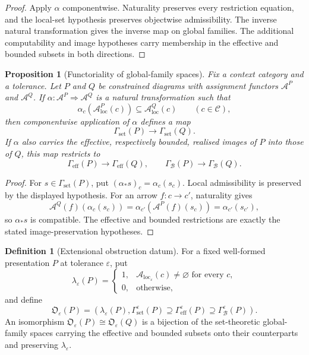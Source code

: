 \documentclass[11pt]{article}
\theoremstyle{plain}
\newtheorem{proposition}[theorem]{Proposition}
\theoremstyle{definition}
\newtheorem{definition}[theorem]{Definition}
\theoremstyle{remark}
\newcommand{\LocalAdm}{\mathcal{A}_{\mathrm{loc}}}
\newcommand{\eps}{\varepsilon}
\begin{document}
\begin{proof}
Apply $\alpha$ componentwise. Naturality preserves every restriction equation,
and the local-set hypothesis preserves objectwise admissibility. The inverse
natural transformation gives the inverse map on global families. The additional
computability and image hypotheses carry membership in the effective and bounded
subsets in both directions.
\end{proof}

\begin{proposition}[Functoriality of global-family spaces]
\label{prop:global-family-functoriality}
Fix a context category and a tolerance. Let $P$ and $Q$ be constrained diagrams
with assignment functors $\mathcal A^P$ and $\mathcal A^Q$. If
$\alpha:\mathcal A^P\Rightarrow\mathcal A^Q$ is a natural transformation such
that
\[
\alpha_c(\LocalAdm^P(c))\subseteq\LocalAdm^Q(c)
\qquad(c\in\mathcal C),
\]
then componentwise application of $\alpha$ defines a map
\[
\Gamma_{\mathrm{set}}(P)\longrightarrow\Gamma_{\mathrm{set}}(Q).
\]
If $\alpha$ also carries the effective, respectively bounded, realised images
of $P$ into those of $Q$, this map restricts to
\[
\Gamma_{\mathrm{eff}}(P)\to\Gamma_{\mathrm{eff}}(Q),
\qquad
\Gamma_{\mathcal B}(P)\to\Gamma_{\mathcal B}(Q).
\]
\end{proposition}

\begin{proof}
For $s\in\Gamma_{\mathrm{set}}(P)$, put
$(\alpha_*s)_c=\alpha_c(s_c)$. Local admissibility is preserved by the displayed
hypothesis. For an arrow $f:c\to c'$, naturality gives
\[
\mathcal A^Q(f)(\alpha_c(s_c))
=\alpha_{c'}(\mathcal A^P(f)(s_c))
=\alpha_{c'}(s_{c'}),
\]
so $\alpha_*s$ is compatible. The effective and bounded restrictions are exactly
the stated image-preservation hypotheses.
\end{proof}

\begin{definition}[Extensional obstruction datum]
\label{def:obstruction-datum}
For a fixed well-formed presentation $P$ at tolerance $\eps$, put
\[
\lambda_\eps(P)=
\begin{cases}
1,&\LocalAdm_\eps(c)\ne\varnothing\text{ for every }c,\\
0,&\text{otherwise},
\end{cases}
\]
and define
\[
\mathfrak O_\eps(P)=
\left(
\lambda_\eps(P),
\Gamma_{\mathrm{set}}^\eps(P)
\supseteq\Gamma_{\mathrm{eff}}^\eps(P)
\supseteq\Gamma_{\mathcal B}^\eps(P)
\right).
\]
An isomorphism $\mathfrak O_\eps(P)\cong\mathfrak O_\eps(Q)$ is a bijection of
the set-theoretic global-family spaces carrying the effective and bounded
subsets onto their counterparts and preserving $\lambda_\eps$.
\end{definition}
\end{document}
